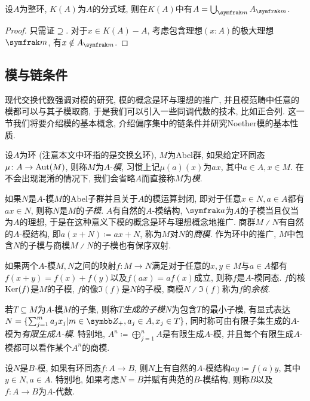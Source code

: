 \begin{proposition}\label{prop:integraldomainlocalizationintersection}
  设$A$为整环, $K(A)$为$A$的分式域, 则在$K(A)$中有$A=\bigcup_{\ideal{m}}A_{\ideal{m}}$.
\end{proposition}

\begin{proof}
  只需证$\supseteq$. 对于$x\in K(A)-A$, 考虑包含理想$(x\colon A)$的极大理想$\ideal{m}$, 有$x\notin A_{\ideal{m}}$.
\end{proof}

\subsection{模与链条件}

现代交换代数强调对模的研究, 模的概念是环与理想的推广, 并且模范畴中任意的模都可以与其子模取商, 于是我们可以引入一些同调代数的技术, 比如正合列. 这一节我们将要介绍模的基本概念, 介绍偏序集中的链条件并研究Noether模的基本性质.

设$A$为环 (注意本文中环指的是交换幺环), $M$为Abel群, 如果给定环同态$\mu\colon A\to \operatorname{Aut}(M)$, 则称$M$为$A$-\emph{模}, 习惯上记$\mu(a)(x)$为$ax$, 其中$a\in A, x\in M$. 在不会出现混淆的情况下, 我们会省略$A$而直接称$M$为\emph{模}.

如果$N$是$A$-模$M$的Abel子群并且关于$A$的模运算封闭, 即对于任意$x\in N, a\in A$都有$ax\in N$, 则称$N$是$M$的\emph{子模}. $A$有自然的$A$-模结构, $\ideal{a}$为$A$的子模当且仅当为$A$的理想, 于是在这种意义下模的概念是环与理想概念地推广. 商群$M{\divslash}N$有自然的$A$-模结构, 即$a(x+N)\coloneq ax+N$, 称为$M$对$N$的\emph{商模}. 作为环中的推广, $M$中包含$N$的子模与商模$M{\divslash}N$的子模也有保序双射.

如果两个$A$-模$M, N$之间的映射$f\colon M\to N$满足对于任意的$x, y\in M$与$a\in A$都有$f(x+y)=f(x)+f(y)$以及$f(ax)=af(x)$成立, 则称$f$是$A$-模同态. $f$的核$\operatorname{Ker} (f)$是$M$的子模, $f$的像$\Im (f)$是$N$的子模, 商模$N{\divslash}\Im (f)$称为$f$的\emph{余核}.

若$T\subseteq M$为$A$-模$M$的子集, 则称$T$\emph{生成的子模}$N$为包含$T$的最小子模, 有显式表达$N=\{\sum_{j=1}^m a_jx_j\vert m\in\ZZ_+, a_j\in A, x_j\in T\}$, 同时称可由有限子集生成的$A$-模为\emph{有限生成$A$-模}. 特别地, $A^n\coloneq \bigoplus_{j=1}^n A$是有限生成$A$-模, 并且每个有限生成$A$-模都可以看作某个$A^n$的商模.

设$N$是$B$-模, 如果有环同态$f\colon A\to B$, 则$N$上有自然的$A$-模结构$ay\coloneq f(a)y$, 其中$y\in N, a\in A$. 特别地, 如果考虑$N=B$并赋有典范的$B$-模结构, 则称$B$以及$f\colon A\to B$为$A$-代数.

